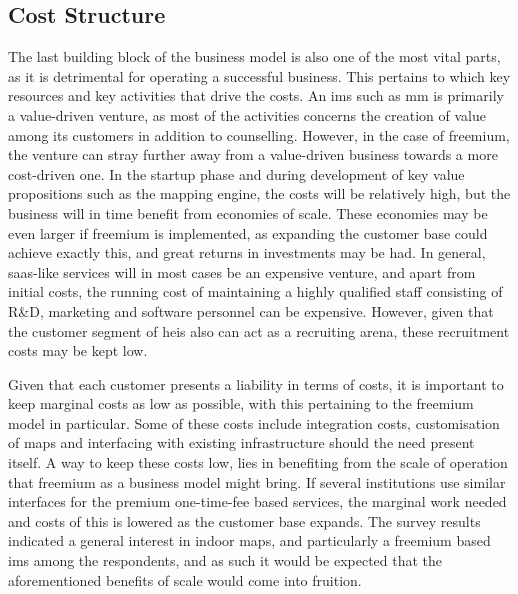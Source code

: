 \subsection{Cost Structure}
The last building block of the business model is also one of the most vital parts, as it is detrimental for operating a successful business. This pertains to which key resources and key activities that drive the costs. An \gls{ims} such as \gls{mm} is primarily a value-driven venture, as most of the activities concerns the creation of value among its customers in addition to counselling. However, in the case of freemium, the venture can stray further away from a value-driven business towards a more cost-driven one. In the startup phase and during development of key value propositions such as the mapping engine, the costs will be relatively high, but the business will in time benefit from economies of scale. These economies may be even larger if freemium is implemented, as expanding the customer base could achieve exactly this, and great returns in investments may be had. In general, \gls{saas}-like services will in most cases be an expensive venture, and apart from initial costs, the running cost of maintaining a highly qualified staff consisting of R\&D, marketing and software personnel can be expensive. However, given that the customer segment of \glspl{hei} also can act as a recruiting arena, these recruitment costs may be kept low. 


Given that each customer presents a liability in terms of costs, it is important to keep marginal costs as low as possible, with this pertaining to the freemium model in particular. Some of these costs include integration costs, customisation of maps and interfacing with existing infrastructure should the need present itself. A way to keep these costs low, lies in benefiting from the scale of operation that freemium as a business model might bring. If several institutions use similar interfaces for the premium one-time-fee based services, the marginal work needed and costs of this is lowered as the customer base expands. The survey results indicated a general interest in indoor maps, and particularly a freemium based \gls{ims} among the respondents, and as such it would be expected that the aforementioned benefits of scale would come into fruition.


